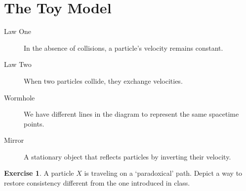 \documentclass[12pt]{article}
\theoremstyle{definition}
\newtheorem{exer}{Exercise}
\begin{document}
\section{The Toy Model}

\begin{description}
\item[Law One] In the absence of collisions, a particle’s velocity remains constant.
\item[Law Two] When two particles collide, they exchange velocities.
\item[Wormhole] We have different lines in the diagram to represent the same spacetime points.
\item[Mirror] A stationary object that reflects particles by inverting their velocity.
\end{description}

\begin{exer}
A particle $X$ is traveling on a `paradoxical' path. Depict a way to restore consistency different from the one introduced in class.
\end{exer}
\end{document}
